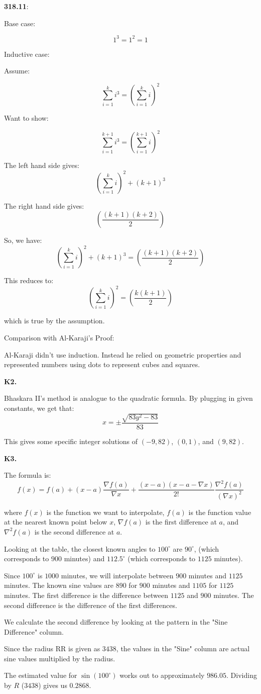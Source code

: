 \documentclass{article}
\begin{document}
\textbf{318.11}:

Base case:

\[1^3 = 1^2 = 1\]

Inductive case:

Assume:

\[\sum_{i=1}^k i^3 = \left(\sum_{i=1}^k i\right)^2\]

Want to show:

\[\sum_{i=1}^{k+1} i^3 = \left(\sum_{i=1}^{k+1} i\right)^2\]

The left hand side gives:
\[\left(\sum_{i=1}^k i\right)^2 + (k+1)^3\]

The right hand side gives:
\[\left(\frac{(k+1)(k+2)}{2}\right)\]

So, we have:
\[\left(\sum_{i=1}^k i\right)^2 + (k+1)^3 = \left(\frac{(k+1)(k+2)}{2}\right)\]

This reduces to:
\[\left(\sum_{i=1}^k i\right)^2 = \left(\frac{k(k+1)}{2}\right)\]

which is true by the assumption.

Comparison with Al-Karaji's Proof:

Al-Karaji didn't use induction. Instead he relied on geometric properties and
represented numbers using dots to represent cubes and squares.


\textbf{K2.}

Bhaskara II's method is analogue to the quadratic formula.
By plugging in given constants, we get that:
\[x = \pm \frac{\sqrt{83y^2 - 83}}{83}\]

This gives some specific integer solutions of $(-9, 82)$, $(0, 1)$, and $(9, 82)$.


\textbf{K3.}

The formula is:
\[f(x) = f(a) + (x-a)\frac{\nabla f(a)}{\nabla x} + \frac{(x-a)(x-a-\nabla x)}{2!} \frac{\nabla^2 f(a)}{(\nabla x)^2}\]

where $f(x)$ is the function we want to interpolate, $f(a)$ is the function
value at the nearest known point below $x$, $\nabla f(a)$ is the first difference
at $a$, and $\nabla^2 f(a)$ is the second difference at $a$.

Looking at the table, the closest known angles to $100^\circ$ are $90^\circ$,
(which corresponds to $900$ minutes) and $112.5^\circ$
(which corresponds to $1125$ minutes).

Since $100^\circ$ is $1000$ minutes, we will interpolate between
$900$ minutes and $1125$ minutes. The known sine values are $890$ for $900$
minutes and $1105$ for $1125$ minutes. The first difference is the difference
between $1125$ and $900$ minutes. The second difference is the difference
of the first differences.

We calculate the second difference by looking at the pattern in the
"Sine Difference" column.

Since the radius RR is given as $3438$,
the values in the "Sine" column are actual sine values
multiplied by the radius.

The estimated value for $\sin(100^\circ)$ works out to
approximately $986.05$. Dividing by $R$ ($3438$) gives us
$0.2868$.
\end{document}
